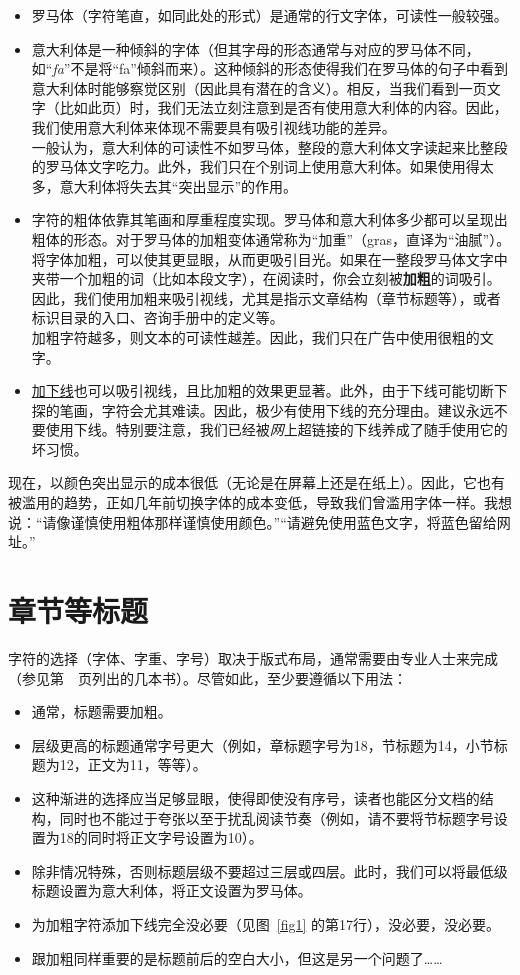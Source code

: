 \begin{itemize}
    \item 罗马体（字符笔直，如同此处的形式）是通常的行文字体，可读性一般较强。
    \item 意大利体是一种倾斜的字体（但其字母的形态通常与对应的罗马体不同，如``\emph{fa}''不是将``fa''倾斜而来）。这种倾斜的形态使得我们在罗马体的句子中看到意大利体时能够察觉区别（因此具有潜在的含义）。相反，当我们看到一页文字（比如此页）时，我们无法立刻注意到是否有使用意大利体的内容。因此，我们使用意大利体来体现不需要具有吸引视线功能的差异。\\
    一般认为，意大利体的可读性不如罗马体，整段的意大利体文字读起来比整段的罗马体文字吃力。此外，我们只在个别词上使用意大利体。如果使用得太多，意大利体将失去其``突出显示''的作用。
    \item 字符的粗体依靠其笔画和厚重程度实现。罗马体和意大利体多少都可以呈现出粗体的形态。对于罗马体的加粗变体通常称为``加重''（gras，直译为``油腻''）。将字体加粗，可以使其更显眼，从而更吸引目光。如果在一整段罗马体文字中夹带一个加粗的词（比如本段文字），在阅读时，你会立刻被\textbf{加粗}的词吸引。因此，我们使用加粗来吸引视线，尤其是指示文章结构（章节标题等），或者标识目录的入口、咨询手册中的定义等。\\
    加粗字符越多，则文本的可读性越差。因此，我们只在广告中使用很粗的文字。
    \item \underline{加下线}也可以吸引视线，且比加粗的效果更显著。此外，由于下线可能切断下探的笔画，字符会尤其难读。因此，极少有使用下线的充分理由。建议永远不要使用下线。特别要注意，我们已经被\emph{网}上超链接的下线养成了随手使用它的坏习惯。
\end{itemize}

现在，以颜色突出显示的成本很低（无论是在屏幕上还是在纸上）。因此，它也有被滥用的趋势，正如几年前切换字体的成本变低，导致我们曾滥用字体一样。我想说：``请像谨慎使用粗体那样谨慎使用颜色。''``请避免使用蓝色文字，将蓝色留给网址。''

\section{章节等标题}

字符的选择（字体、字重、字号）取决于版式布局，通常需要由专业人士来完成（参见第~\pageref{sec8.5}~页列出的几本书）。尽管如此，至少要遵循以下用法：

\begin{itemize}
    \item 通常，标题需要加粗。
    \item 层级更高的标题通常字号更大（例如，章标题字号为18，节标题为14，小节标题为12，正文为11，等等）。
    \item 这种渐进的选择应当足够显眼，使得即使没有序号，读者也能区分文档的结构，同时也不能过于夸张以至于扰乱阅读节奏（例如，请不要将节标题字号设置为18的同时将正文字号设置为10）。
    \item 除非情况特殊，否则标题层级不要超过三层或四层。此时，我们可以将最低级标题设置为意大利体，将正文设置为罗马体。
    \item 为加粗字符添加下线完全没必要（见图~\ref{fig1} 的第17行），没必要，没必要。
    \item 跟加粗同样重要的是标题前后的空白大小，但这是另一个问题了……
\end{itemize}

